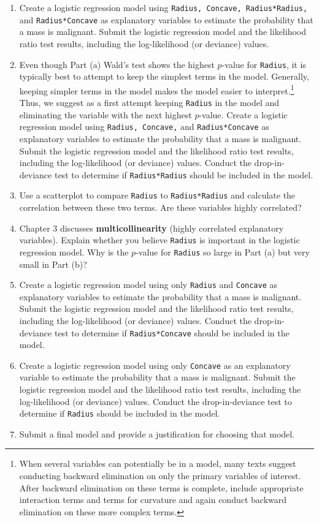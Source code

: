 \documentclass[
]{book}
\begin{document}
\begin{enumerate}
  \begin{enumerate}
    \item Create a logistic regression model using \texttt{Radius, Concave, Radius*Radius,} and \texttt{Radius*Concave} as explanatory variables to estimate the probability that a mass is malignant. Submit the logistic regression model and the likelihood ratio test results, including the log-likelihood (or deviance) values.
    \item Even though Part (a) Wald’s test shows the highest $p$-value for \texttt{Radius}, it is typically best to attempt to keep the simplest terms in the model. Generally, keeping simpler terms in the model makes the model easier to interpret.\footnote{When several variables can potentially be in a model, many texts suggest conducting backward elimination on only the primary variables of interest. After backward elimination on these terms is complete, include appropriate interaction terms and terms for curvature and again conduct backward elimination on these more complex terms.} Thus, we suggest as a first attempt keeping \texttt{Radius} in the model and eliminating the variable with the next highest $p$-value. Create a logistic regression model using \texttt{Radius, Concave,} and \texttt{Radius*Concave} as explanatory variables to estimate the probability that a mass is malignant. Submit the logistic regression model and the likelihood ratio test results, including the log-likelihood (or deviance) values. Conduct the drop-in-deviance test to determine if \texttt{Radius*Radius} should be included in the model.
    \item Use a scatterplot to compare \texttt{Radius} to \texttt{Radius*Radius} and calculate the correlation between these two terms. Are these variables highly correlated?
    \item Chapter 3 discusses \textbf{multicollinearity} (highly correlated explanatory variables). Explain whether you believe \texttt{Radius} is important in the logistic regression model. Why is the $p$-value for \texttt{Radius} so large in Part (a) but very small in Part (b)?
    \item Create a logistic regression model using only \texttt{Radius} and \texttt{Concave} as explanatory variables to estimate the probability that a mass is malignant. Submit the logistic regression model and the likelihood ratio test results, including the log-likelihood (or deviance) values. Conduct the drop-in-deviance test to determine if \texttt{Radius*Concave} should be included in the model.
    \item Create a logistic regression model using only \texttt{Concave} as an explanatory variable to estimate the probability that a mass is malignant. Submit the logistic regression model and the likelihood ratio test results, including the log-likelihood (or deviance) values. Conduct the drop-in-deviance test to determine if \texttt{Radius} should be included in the model.
    \item Submit a final model and provide a justification for choosing that model.
  \end{enumerate}


\end{enumerate}
\end{document}
